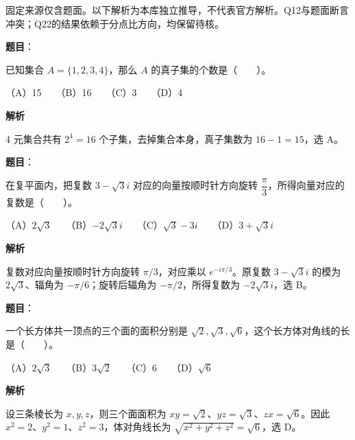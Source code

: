 

\begin{gktip}
固定来源仅含题面。以下解析为本库独立推导，不代表官方解析。Q12与题面断言冲突；Q22的结果依赖于分点比方向，均保留待核。
\end{gktip}


\begin{answer}

\textbf{题目}：

已知集合 $A=\{1,2,3,4\}$，那么 $A$ 的真子集的个数是\mbox{（　　）}。

（A）15　　（B）16　　（C）3　　（D）4

\textbf{解析}

4 元集合共有 $2^4=16$ 个子集，去掉集合本身，真子集数为 $16-1=15$，选 A。


\end{answer}
\begin{answer}

\textbf{题目}：

在复平面内，把复数 $3-\sqrt{3}i$ 对应的向量按顺时针方向旋转 $\dfrac{\pi}{3}$，所得向量对应的复数是\mbox{（　　）}。

（A）$2\sqrt{3}$　　（B）$-2\sqrt{3}i$　　（C）$\sqrt{3}-3i$　　（D）$3+\sqrt{3}i$

\textbf{解析}

复数对应向量按顺时针方向旋转 $\pi/3$，对应乘以 $e^{-i\pi/3}$。原复数 $3-\sqrt3 i$ 的模为 $2\sqrt3$、辐角为 $-\pi/6$；旋转后辐角为 $-\pi/2$，所得复数为 $-2\sqrt3 i$，选 B。


\end{answer}
\begin{answer}

\textbf{题目}：

一个长方体共一顶点的三个面的面积分别是 $\sqrt{2},\sqrt{3},\sqrt{6}$，这个长方体对角线的长是\mbox{（　　）}。

（A）$2\sqrt{3}$　　（B）$3\sqrt{2}$　　（C）$6$　　（D）$\sqrt{6}$

\textbf{解析}

设三条棱长为 $x,y,z$，则三个面面积为 $xy=\sqrt2$、$yz=\sqrt3$、$zx=\sqrt6$。因此 $x^2=2$、$y^2=1$、$z^2=3$，体对角线长为 $\sqrt{x^2+y^2+z^2}=\sqrt6$，选 D。


\end{answer}
